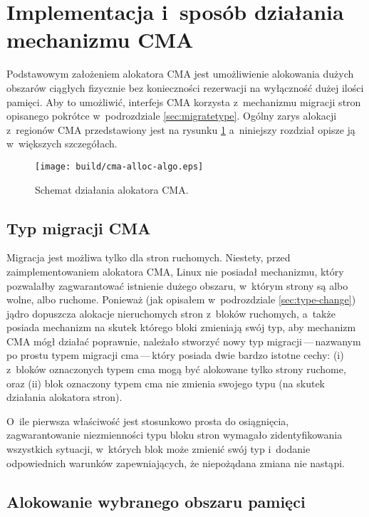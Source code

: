 \section{Implementacja i~sposób działania mechanizmu CMA}

Podstawowym założeniem alokatora CMA jest umożliwienie alokowania
dużych obszarów ciągłych fizycznie bez konieczności rezerwacji na
wyłączność dużej ilości pamięci.  Aby to umożliwić, interfejs CMA
korzysta z~mechanizmu migracji stron opisanego pokrótce w~podrozdziale
\ref{sec:migratetype}.  Ogólny zarys alokacji z~regionów CMA
przedstawiony jest na rysunku \ref{fig:cma-alloc-algo} a~niniejszy
rozdział opisze ją w~większych szczegółach.

\begin{figure}[tbp]
  \texttt{[image: build/cma-alloc-algo.eps]}
  \caption{Schemat działania alokatora CMA.}
  \label{fig:cma-alloc-algo}
\end{figure}


\subsection{Typ migracji CMA}\label{sec:migrate-cma}

Migracja jest możliwa tylko dla stron ruchomych.  Niestety, przed
zaimplementowaniem alokatora CMA, Linux nie posiadał mechanizmu, który
pozwalałby zagwarantować istnienie dużego obszaru, w~którym strony są
albo wolne, albo ruchome.  Ponieważ (jak opisałem w~podrozdziale
\ref{sec:type-change}) jądro dopuszcza alokacje nieruchomych stron
z~bloków ruchomych, a~także posiada mechanizm na skutek którego bloki
zmieniają swój typ, aby mechanizm CMA mógł działać poprawnie, należało
stworzyć nowy typ migracji\,---\,nazwanym po prostu typem migracji
cma\,---\,który posiada dwie bardzo istotne cechy: (i) z~bloków
oznaczonych typem cma mogą być alokowane tylko strony ruchome, oraz
(ii) blok oznaczony typem cma nie zmienia swojego typu (na skutek
działania alokatora stron).

O~ile pierwsza właściwość jest stosunkowo prosta do osiągnięcia,
zagwarantowanie niezmienności typu bloku stron wymagało
zidentyfikowania wszystkich sytuacji, w~których blok może zmienić swój
typ i~dodanie odpowiednich warunków zapewniających, że niepożądana
zmiana nie nastąpi.

\subsection{Alokowanie wybranego obszaru pamięci}\label{sec:alloc-contig-range}

